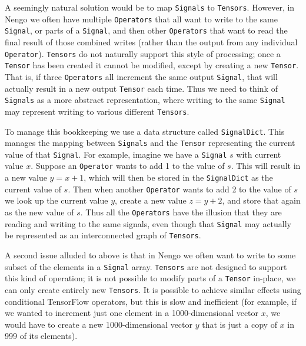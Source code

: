 \documentclass{article}
\begin{document}
A seemingly natural solution would be to map \texttt{Signals} to \texttt{Tensors}.  However, in Nengo we often have multiple \texttt{Operators} that all want to write to the same \texttt{Signal}, or parts of a \texttt{Signal}, and then other \texttt{Operators} that want to read the final result of those combined writes (rather than the output from any individual \texttt{Operator}).  \texttt{Tensors} do not naturally support this style of processing; once a \texttt{Tensor} has been created it cannot be modified, except by creating a new \texttt{Tensor}.  That is, if three \texttt{Operators} all increment the same output \texttt{Signal}, that will actually result in a new output \texttt{Tensor} each time.  Thus we need to think of \texttt{Signals} as a more abstract representation, where writing to the same \texttt{Signal} may represent writing to various different \texttt{Tensors}.

To manage this bookkeeping we use a data structure called \texttt{SignalDict}.  This manages the mapping between \texttt{Signals} and the \texttt{Tensor} representing the current value of that \texttt{Signal}.  For example, imagine we have a \texttt{Signal} $s$ with current value $x$.  Suppose an \texttt{Operator} wants to add 1 to the value of $s$.  This will result in a new value $y = x + 1$, which will then be stored in the \texttt{SignalDict} as the current value of $s$.  Then when another \texttt{Operator} wants to add 2 to the value of $s$ we look up the current value $y$, create a new value $z = y + 2$, and store that again as the new value of $s$.  Thus all the \texttt{Operators} have the illusion that they are reading and writing to the same signals, even though that \texttt{Signal} may actually be represented as an interconnected graph of \texttt{Tensors}.

A second issue alluded to above is that in Nengo we often want to write to some subset of the elements in a \texttt{Signal} array.  \texttt{Tensors} are not designed to support this kind of operation; it is not possible to modify parts of a \texttt{Tensor} in-place, we can only create entirely new \texttt{Tensors}.  It is possible to achieve similar effects using conditional TensorFlow operators, but this is slow and inefficient (for example, if we wanted to increment just one element in a 1000-dimensional vector $x$, we would have to create a new 1000-dimensional vector $y$ that is just a copy of $x$ in 999 of its elements).
\end{document}
